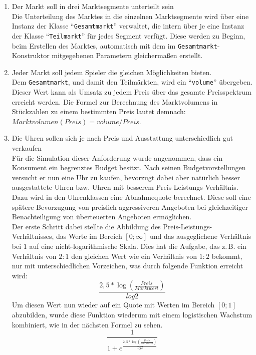 \begin{enumerate}
	\item Der Markt soll in drei Marktsegmente unterteilt sein
	\\ Die Unterteilung des Marktes in die einzelnen Marktsegmente wird über eine Instanz der Klasse \enquote{\texttt{Gesamtmarkt}} verwaltet, die intern über je eine Instanz der Klasse \enquote{\texttt{Teilmarkt}} für jedes Segment verfügt. Diese werden zu Beginn, beim Erstellen des Marktes, automatisch mit dem im \texttt{Gesamtmarkt}-Konstruktor mitgegebenen Parametern gleichermaßen erstellt.
	\item Jeder Markt soll jedem Spieler die gleichen Möglichkeiten bieten.
	\\ Dem \texttt{Gesamtmarkt}, und damit den Teilmärkten, wird ein \enquote{\texttt{volume}} übergeben. Dieser Wert kann als Umsatz zu jedem Preis über das gesamte Preisspektrum erreicht werden. Die Formel zur Berechnung des Marktvolumens in Stückzahlen zu einem bestimmten Preis lautet demnach: \(Marktvolumen(Preis)=volume/Preis\).
	\item Die Uhren sollen sich je nach Preis und Ausstattung unterschiedlich gut verkaufen
	\\ Für die Simulation dieser Anforderung wurde angenommen, dass ein Konsument ein begrenztes Budget besitzt. Nach seinen Budgetvorstellungen versucht er nun eine Uhr zu kaufen, bevorzugt dabei aber natürlich besser ausgestattete Uhren bzw. Uhren mit besserem Preis-Leistungs-Verhältnis. Dazu wird in den Uhrenklassen eine Abnahmequote berechnet. Diese soll eine spätere Bevorzugung von preislich aggressiveren Angeboten bei gleichzeitiger Benachteiligung von überteuerten Angeboten ermöglichen. \\
	Der erste Schritt dabei stellte die Abbildung des Preis-Leistungs-Verhältnisses, das Werte im Bereich \([0;\infty]\) und das ausgeglichene Verhältnis bei \(1\) auf eine nicht-logarithmische Skala. Dies hat die Aufgabe, das z.\,B. ein Verhältnis von \(2:1\) den gleichen Wert wie ein Verhältnis von \(1:2\) bekommt, nur mit unterschiedlichen Vorzeichen, was durch folgende Funktion erreicht wird: \[\frac{2,5*\log (\frac{Preis}{Marktwert})}{log 2}\]
	Um diesen Wert nun wieder auf ein Quote mit Werten im Bereich \([0;1]\) abzubilden, wurde diese Funktion wiederum mit einem logistischen Wachstum kombiniert, wie in der nächsten Formel zu sehen. \[\frac{1}{1+e^{\frac{2,5*\log (\frac{Preis}{Marktwert})}{log 2}}} \]\\
	

\end{enumerate}
